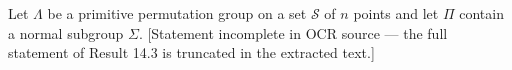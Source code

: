 Let $\Lambda$ be a primitive permutation group on a set $\mathcal{S}$ of $n$ points and let $\Pi$ contain a normal subgroup $\Sigma$. [Statement incomplete in OCR source — the full statement of Result 14.3 is truncated in the extracted text.]
